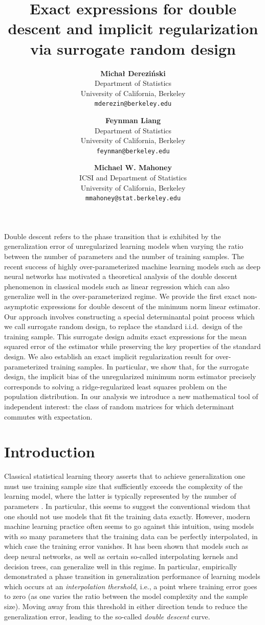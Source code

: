 \documentclass[thesis.tex]{subfiles}
\title{Exact expressions for double descent
 and implicit regularization
 \\
 via surrogate random design}
\author{%
           \textbf{Micha{\l } Derezi\'{n}ski} \\
   Department of Statistics\\
   University of California, Berkeley\\
   \texttt{mderezin@berkeley.edu}\\
   \and
   \textbf{Feynman Liang} \\
   Department of Statistics\\
   University of California, Berkeley\\
   \texttt{feynman@berkeley.edu}
   \and
    \textbf{Michael W. Mahoney}\\
   ICSI and Department of Statistics\\
   University of California, Berkeley\\
   \texttt{mmahoney@stat.berkeley.edu}
 }
\begin{document}

  Double descent refers to the phase transition that is exhibited by
  the generalization error of unregularized learning models when varying the ratio
  between the number of parameters and the number of training
  samples. The recent success of highly over-parameterized machine learning
  models such as deep neural networks has motivated a theoretical analysis of
  the double descent phenomenon in classical models such as linear
  regression which can also generalize well in the over-parameterized
  regime. We provide the first exact non-asymptotic
  expressions for double descent of the minimum norm linear
  estimator. Our approach involves constructing a special
  determinantal point process  which we call surrogate random
  design, to replace the standard i.i.d.~design of the training
  sample. This surrogate design admits exact expressions for the mean
  squared error of the estimator while preserving the key properties
  of the standard design. We also establish an exact implicit
  regularization result for over-parameterized training samples. In
  particular, we show that, for the surrogate design, the implicit bias
  of the unregularized minimum norm estimator precisely corresponds to
  solving a ridge-regularized least squares problem on the population
  distribution. In our analysis we introduce a new mathematical tool of
  independent interest: the class of random matrices for which
  determinant commutes with expectation.


\section{Introduction}

Classical statistical learning theory asserts that to achieve generalization
one must use training sample size that sufficiently exceeds the complexity of
the learning model, where the latter is typically represented by the number of
parameters \citep[or some related structural parameter; see][]{HFT09}.  In particular,
this seems to suggest the conventional wisdom that one should not use models
that fit the training data exactly.  However, modern machine learning practice
often seems to go against this intuition, using models with so many parameters
that the training data can be perfectly interpolated, in which case the
training error vanishes. It has been shown that models such as deep neural
networks, as well as certain so-called interpolating kernels and decision
trees, can generalize well in this regime. In particular,
\cite{BHMM19} empirically demonstrated a phase transition in generalization
performance of learning models which occurs at an \emph{interpolation
  thershold}, i.e., a point where training error goes to zero (as one varies the
ratio between the model complexity and the sample size). Moving away from this
threshold in either direction tends to reduce the generalization error, leading
to the so-called \emph{double descent} curve.
\end{document}
